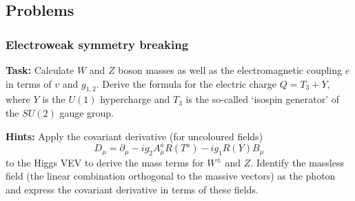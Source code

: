 \documentclass[12pt]{article}
\newcommand{\be}{\begin{equation}}
\newcommand{\ee}{\end{equation}}
\numberwithin{equation}{section}
\begin{document}
\subsection{Problems}

\subsubsection{Electroweak symmetry breaking}

{\bf Task:} Calculate $W$ and $Z$ boson masses as well as the electromagnetic coupling $e$ in terms of $v$ and $g_{1,2}$. Derive the formula for the electric charge $Q=T_3+Y$, where $Y$ is the $U(1)$ hypercharge and $T_3$ is the so-called `isospin generator' of the $SU(2)$ gauge group.

\noindent
{\bf Hints:} Apply the covariant derivative (for uncoloured fields)
\be
D_\mu=\partial_\mu - ig_2 A_\mu^a R(T^a) - ig_1 R(Y) B_\mu
\ee
to the Higgs VEV to derive the mass terms for $W^{\pm}$ and $Z$. Identify the massless field (the linear combination orthogonal to the massive vectors) as the photon and express the covariant derivative in terms of these fields.
\end{document}
